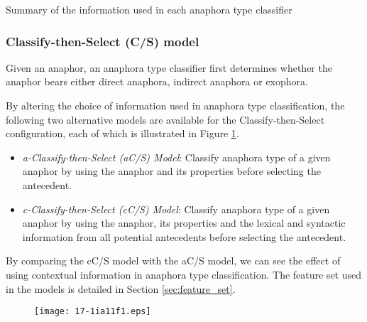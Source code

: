\documentclass[english]{jnlp_1.4}
\newcommand{\wire}[1]{}
\begin{document}
\begin{table}[b]
\caption{Summary of the information used in each anaphora type classifier}
\label{tb:info_model}

\end{table}


\subsubsection{Classify-then-Select (C/S) model}

Given an anaphor, an anaphora type classifier first determines whether
\pagebreak
the anaphor bears either direct anaphora, indirect anaphora or
exophora. \wire{If the anaphora type is judged as direct anaphora,
  then the direct antecedent selection model is called. If the
  anaphora type is judged as indirect anaphora, on the other hand,
  then \wire{the indirect antecedent selection model is called}. There
  is no antecedent selection model called if exophora is selected.}

By altering the choice of information used in anaphora type
classification, the following two alternative models are available for
the Classify-then-Select configuration, each of which is illustrated
in Figure \ref{fig:cs_models}.
\begin{itemize}
\item \emph{a-Classify-then-Select (aC/S) Model}: Classify anaphora
  type of a given anaphor by using the anaphor and its properties
  before selecting the antecedent.
\item \emph{c-Classify-then-Select (cC/S) Model}: Classify anaphora
  type of a given anaphor by using the anaphor, its properties and the
  lexical and syntactic information from all potential antecedents
  before selecting the antecedent.
\end{itemize}
By comparing the cC/S model with the aC/S model, we can see the effect
of using contextual information in anaphora type classification. The
feature set used in the models is detailed in Section
\ref{sec:feature_set}.

\begin{figure}[b]
\begin{center}
  \texttt{[image: 17-1ia11f1.eps]}
\end{center}
\vspace{0.5zw}
\label{fig:cs_models}
\end{figure}
\end{document}
